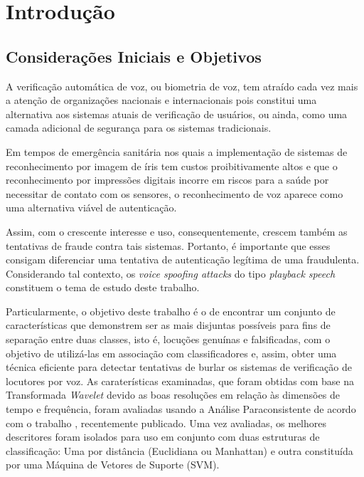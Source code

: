 \chapter{Introdução}
	\section{Considerações Iniciais e Objetivos}
		\par A verificação automática de voz, ou biometria de voz, tem atraído cada vez mais a atenção de organizações nacionais e internacionais pois constitui uma alternativa aos sistemas atuais de verificação de usuários, ou ainda, como uma camada adicional de segurança para os sistemas tradicionais. 
		
		\par Em tempos de emergência sanitária nos quais a implementação de sistemas de reconhecimento por imagem de íris tem custos proibitivamente altos e que o reconhecimento por impressões digitais incorre em riscos para a saúde por necessitar de contato com os sensores, o reconhecimento de voz aparece como uma alternativa viável de autenticação.		
		
		\par Assim, com o crescente interesse e uso, consequentemente, crescem também as tentativas de fraude contra tais sistemas. Portanto, é importante que esses consigam diferenciar uma tentativa de autenticação legítima de uma fraudulenta. Considerando tal contexto, os \textit{voice spoofing attacks} do tipo \textit{playback speech} constituem o tema de estudo deste trabalho. 

		\par Particularmente, o objetivo deste trabalho é o de encontrar um conjunto de características que demonstrem ser as mais disjuntas possíveis para fins de separação entre duas classes, isto é, locuções genuínas e falsificadas, com o objetivo de utilizá-las em associação com classificadores e, assim, obter uma técnica eficiente para detectar tentativas de burlar os sistemas de verificação de locutores por voz. As caraterísticas examinadas, que foram obtidas com base na Transformada \textit{Wavelet} devido as boas resoluções em relação às dimensões de tempo e frequência, foram avaliadas usando a Análise Paraconsistente de acordo com o trabalho \cite{8588433}, recentemente publicado. Uma vez avaliadas, os melhores descritores foram isolados para uso em conjunto com duas estruturas de classificação: Uma por distância (Euclidiana ou Manhattan) e outra constituída por uma Máquina de Vetores de Suporte (SVM). 
		
